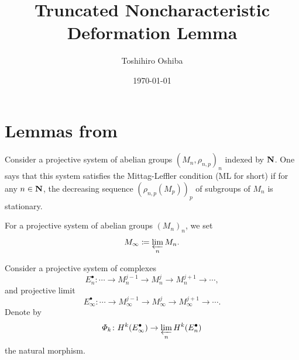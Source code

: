 \newcommand{\cotn}[1][]{\dot{T}^{\ast}{#1}}


\newcommand{\muhom}{\mu hom}
\newcommand{\muHom}[1][]{\mathrm{Hom}^\mu_{\raise1.5ex\hbox to.1em{}#1}}

\newcommand{\mucat}[2][]{\mathsf{D}^{\mathrm{b}}_{#1}(#2)}

\newcommand{\conv}[1][]{\mathbin{\mathop{\circ}\limits_{#1}}}


\newcommand{\lopen}{\mathopen{]}}
\newcommand{\lclosed}{\mathopen{[}}
\newcommand{\ropen}{\mathclose{[}}
\newcommand{\rclosed}{\mathopen{]}}

\newcommand{\sm}{\raisebox{2.33pt}{~\rule{6.4pt}{1.3pt}~}}
\newcommand{\smi}{\smallsetminus}

\newcommand{\smid}{\mathrel{;}}



\title{Truncated Noncharacteristic Deformation Lemma}
\author{Toshihiro Oshiba}
\date{\today}

\maketitle

\section{Lemmas from {\cite{KS90}}}

Consider a projective system of abelian groups \(
  \left(M_n,\rho_{n,p}\right)_n
\) indexed by \(\nn\). 
One says that this system satisfies 
the Mittag-Leffler condition (ML for short) 
if for any \(n\in\nn\), the decreasing sequence \(
  (\rho_{n,p}(M_p))_p
\) of subgroups of \(M_n\) is stationary.

For a projective system of abelian groups \((M_{n})_n\), 
we set \[
  M_{\infty}\coloneqq \prolim[n]M_n.
\]

Consider a projective system of complexes
\begin{equation}
  E_n^{\bullet}\colon 
  \cdots\to M_{n}^{j-1}\to M_{n}^{j}\to M_{n}^{j+1}\to\cdots,
\end{equation}
and projective limit
\begin{equation}
  E_{\infty}^{\bullet}\colon 
  \cdots
  \to M_{\infty}^{j-1}
  \to M_{\infty}^{j}
  \to M_{\infty}^{j+1}
  \to\cdots.
\end{equation}
Denote by 
\begin{equation}
  \varPhi_{k}\colon H^{k}(E_{\infty}^{\bullet})\to \prolim[n]H^{k}(E_{n}^{\bullet})
\end{equation}
the natural morphism.

